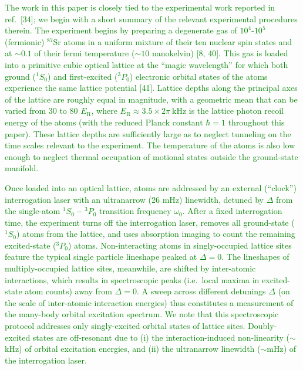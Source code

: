 \documentclass[preprint,showkeys,nofootinbib]{revtex4-1}
\renewcommand{\t}{\text} %
\newcommand{\1}{\mathds{1}}
\newcommand{\green}[1]{\textcolor{green}{#1}}
\newcounter{point}
\begin{document}
\begin{enumerate}[label=(R1.\arabic{point}.\arabic*)]
  \green{The work in this paper is closely tied to the experimental
    work reported in ref.~[34]; we begin with a short summary of the
    relevant experimental procedures therein.  The experiment begins
    by preparing a degenerate gas of $10^4$-$10^5$ (fermionic)
    ${}^{87}$Sr atoms in a uniform mixture of their ten nuclear spin
    states and at $\sim0.1$ of their fermi temperature ($\sim10$
    nanokelvin) [8, 40].  This gas is loaded into a primitive cubic
    optical lattice at the ``magic wavelength'' for which both ground
    (${}^1S_0$) and first-excited (${}^3P_0$) electronic orbital
    states of the atoms experience the same lattice potential [41].
    Lattice depths along the principal axes of the lattice are roughly
    equal in magnitude, with a geometric mean that can be varied from
    30 to 80 $E_{\t{R}}$, where
    $E_{\t{R}}\approx3.5\times2\pi~\t{kHz}$ is the lattice photon
    recoil energy of the atoms (with the reduced Planck constant
    $\hbar=1$ throughout this paper).  These lattice depths are
    sufficiently large as to neglect tunneling on the time scales
    relevant to the experiment.  The temperature of the atoms is also
    low enough to neglect thermal occupation of motional states
    outside the ground-state manifold.}

  \green{Once loaded into an optical lattice, atoms are addressed by
    an external (``clock'') interrogation laser with an ultranarrow
    (26 mHz) linewidth, detuned by $\Delta$ from the single-atom
    ${}^1S_0-{}^3P_0$ transition frequency $\omega_0$.  After a fixed
    interrogation time, the experiment turns off the interrogation
    laser, removes all ground-state (${}^1S_0$) atoms from the
    lattice, and uses absorption imaging to count the remaining
    excited-state (${}^3P_0$) atoms.  Non-interacting atoms in
    singly-occupied lattice sites feature the typical single particle
    lineshape peaked at $\Delta=0$.  The lineshapes of
    multiply-occupied lattice sites, meanwhile, are shifted by
    inter-atomic interactions, which results in spectroscopic peaks
    (i.e.~local maxima in excited-state atom counts) away from
    $\Delta=0$.  A sweep across different detunings $\Delta$ (on the
    scale of inter-atomic interaction energies) thus constitutes a
    measurement of the many-body orbital excitation spectrum.  We note
    that this spectroscopic protocol addresses only singly-excited
    orbital states of lattice sites.  Doubly-excited states are
    off-resonant due to (i) the interaction-induced non-linearity
    ($\sim$kHz) of orbital excitation energies, and (ii) the
    ultranarrow linewidth ($\sim$mHz) of the interrogation laser.}


\end{enumerate}
\end{document}
